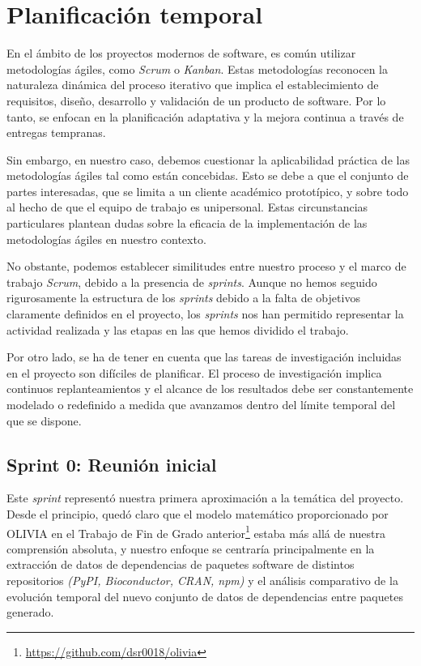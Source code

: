 \section{Planificación temporal}

En el ámbito de los proyectos modernos de software, es común utilizar metodologías ágiles, como \textit{Scrum} 
o \textit{Kanban}. Estas metodologías reconocen la naturaleza dinámica del proceso iterativo que implica el 
establecimiento de requisitos, diseño, desarrollo y validación de un producto de software. Por lo tanto, 
se enfocan en la planificación adaptativa y la mejora continua a través de entregas tempranas.

Sin embargo, en nuestro caso, debemos cuestionar la aplicabilidad práctica de las metodologías ágiles 
tal como están concebidas. Esto se debe a que el conjunto de partes interesadas, que se limita a un 
cliente académico prototípico, y sobre todo al hecho de que el equipo de trabajo es unipersonal. Estas 
circunstancias particulares plantean dudas sobre la eficacia de la implementación de las metodologías 
ágiles en nuestro contexto.

No obstante, podemos establecer similitudes entre nuestro proceso y el marco de trabajo \textit{Scrum}, 
debido a la presencia de \textit{sprints}. Aunque no hemos seguido rigurosamente la estructura de los \textit{sprints} 
debido a la falta de objetivos claramente definidos en el proyecto, los \textit{sprints} nos han permitido 
representar la actividad realizada y las etapas en las que hemos dividido el trabajo.

Por otro lado, se ha de tener en cuenta que las tareas de investigación incluidas en el proyecto son 
difíciles de planificar. El proceso de investigación implica continuos replanteamientos y el alcance de 
los resultados debe ser constantemente modelado o redefinido a medida que avanzamos dentro del límite 
temporal del que se dispone.

\subsection{Sprint 0: Reunión inicial}

Este \textit{sprint} representó nuestra primera aproximación a la temática del proyecto. Desde el principio, quedó 
claro que el modelo matemático proporcionado por OLIVIA en el Trabajo de Fin de Grado anterior\footnote{\url{https://github.com/dsr0018/olivia}}  estaba más allá de 
nuestra comprensión absoluta\cite{Seto-Rey20231}, y nuestro enfoque se centraría principalmente en la extracción de datos 
de dependencias de paquetes software de distintos repositorios \textit{(PyPI, Bioconductor, CRAN, npm)} y el análisis comparativo de 
la evolución temporal del nuevo conjunto de datos de dependencias entre paquetes generado.

